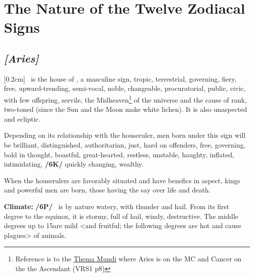 
\section{The Nature of the Twelve Zodiacal Signs}
\subsection{\textit{[Aries]}}
[0.2cm]
 \Aries\, is the house of \Mars, a  masculine sign,  tropic,  terrestrial, governing,  fiery, free, upward-trending,  semi-vocal, noble, changeable, procuratorial, public, civic, with few offspring,  servile, the Midheaven\footnote{Reference is to the \href{http://planetwavesweekly.com/dadatemp/1832374392.html}{Thema Mundi} where Aries is on the MC and Cancer on the the Ascendant (VRS1 p8)} of the universe and the cause of rank, two-toned (since the Sun and the Moon make white lichen). It is also unaspected and ecliptic. 

\mndl[0.2cm]
Depending on its relationship with the houseruler, men born under this sign will be brilliant, distinguished, authoritarian, just, hard on offenders, free, governing, bold in thought, boastful, great-hearted, restless, unstable, haughty, inflated, intimidating, \textbf{/6K/} quickly changing, wealthy. 

\mndl[0.2cm]
When the houserulers are favorably situated and have benefics in aspect, kings and powerful men are born, those having the say over life and death.

\textbf{Climate:} \textbf{/6P/} \Aries\, is by nature watery, with thunder and hail. From its first degree to the equinox, it is stormy, full of hail, windy, destructive. The middle degrees up to 15\deg are mild <and fruitful; the following degrees are hot and cause plagues> of animals. 

